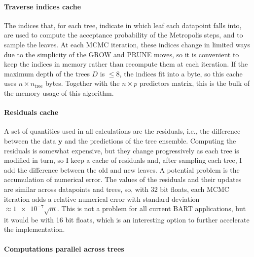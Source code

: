 \documentclass{article}
\begin{document}
    \paragraph{Traverse indices cache}

    The indices that, for each tree, indicate in which leaf each datapoint falls into, are used to compute the acceptance probability of the Metropolis steps, and to sample the leaves. At each MCMC iteration, these indices change in limited ways due to the simplicity of the GROW and PRUNE moves, so it is convenient to keep the indices in memory rather than recompute them at each iteration. If the maximum depth of the trees $D$ is $\le 8$, the indices fit into a byte, so this cache uses $n \times n_\text{tree}$ bytes. Together with the $n\times p$ predictors matrix, this is the bulk of the memory usage of this algorithm.

    \paragraph{Residuals cache}

    A set of quantities used in all calculations are the residuals, i.e., the difference between the data $\mathbf y$ and the predictions of the tree ensemble. Computing the residuals is somewhat expensive, but they change progressively as each tree is modified in turn, so I keep a cache of residuals and, after sampling each tree, I add the difference between the old and new leaves. A potential problem is the accumulation of numerical error. The values of the residuals and their updates are similar across datapoints and trees, so, with 32 bit floats, each MCMC iteration adds a relative numerical error with standard deviation $\approx \num{1e-7} \sqrt m$. This is not a problem for all current BART applications, but it would be with 16 bit floats, which is an interesting option to further accelerate the implementation.

    \paragraph{Computations parallel across trees}
\end{document}
